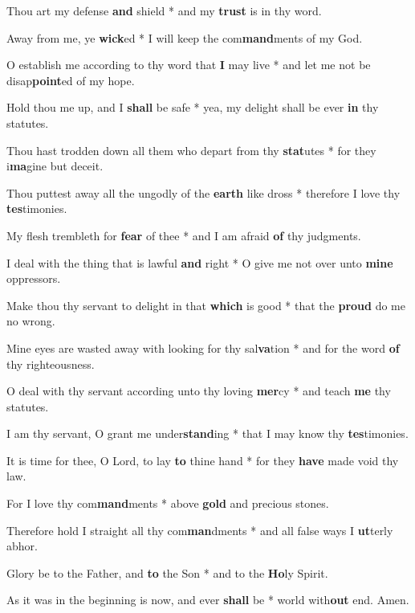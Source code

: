 \begin{multicols}{2}
	Thou art my defense \textbf{and} shield * and my \textbf{trust} is in thy word.
	
	Away from me, ye \textbf{wick}ed * I will keep the com\textbf{mand}ments of my God.
	
	O establish me according to thy word that \textbf{I} may live * and let me not be disap\textbf{point}ed of my hope.
	
	Hold thou me up, and I \textbf{shall} be safe * yea, my delight shall be ever \textbf{in} thy statutes.
	
	Thou hast trodden down all them who depart from thy \textbf{stat}utes * for they i\textbf{ma}gine but deceit.
	
	Thou puttest away all the ungodly of the \textbf{earth} like dross * therefore I love thy \textbf{tes}timonies.
	
	My flesh trembleth for \textbf{fear} of thee * and I am afraid \textbf{of} thy judgments.
	
	I deal with the thing that is lawful \textbf{and} right * O give me not over unto \textbf{mine} oppressors.
	
	Make thou thy servant to delight in that \textbf{which} is good * that the \textbf{proud} do me no wrong.
	
	Mine eyes are wasted away with looking for thy sal\textbf{va}tion * and for the word \textbf{of} thy righteousness.
	
	O deal with thy servant according unto thy loving \textbf{mer}cy * and teach \textbf{me} thy statutes.
	
	I am thy servant, O grant me under\textbf{stand}ing * that I may know thy \textbf{tes}timonies.
	
	It is time for thee, O Lord, to lay \textbf{to} thine hand * for they \textbf{have} made void thy law.
	
	For I love thy com\textbf{mand}ments * above \textbf{gold} and precious stones.
	
	Therefore hold I straight all thy com\textbf{man}dments * and all false ways I \textbf{ut}terly abhor. 
	
	Glory be to the Father, and \textbf{to} the Son * and to the \textbf{Ho}ly Spirit.
	
	As it was in the beginning is now, and ever \textbf{shall} be * world with\textbf{out} end. Amen.
\end{multicols}